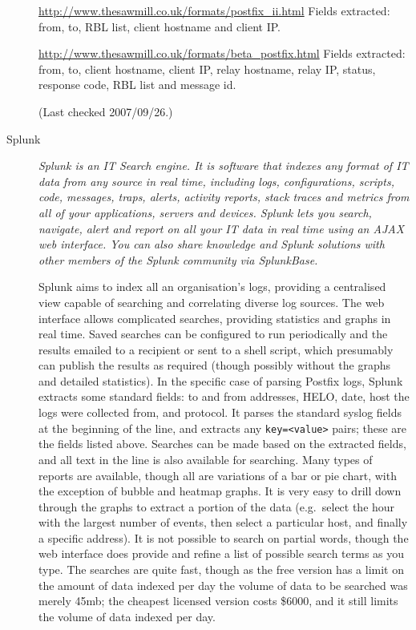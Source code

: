\documentclass[a4paper,12pt,draft]{article}
\begin{document}
\begin{description}
        \url{http://www.thesawmill.co.uk/formats/postfix_ii.html} \newline
        Fields extracted: from, to, RBL list, client hostname and client
        IP\@.

        \url{http://www.thesawmill.co.uk/formats/beta_postfix.html}
        \newline Fields extracted: from, to, client hostname, client IP,
        relay hostname, relay IP, status, response code, RBL list and
        message id.

        (Last checked 2007/09/26.)

    \item [Splunk] \textit{Splunk is an IT Search engine. It is software
        that indexes any format of IT data from any source in real time,
        including logs, configurations, scripts, code, messages, traps,
        alerts, activity reports, stack traces and metrics from all of your
        applications, servers and devices. Splunk lets you search,
        navigate, alert and report on all your IT data in real time using
        an AJAX web interface. You can also share knowledge and Splunk
        solutions with other members of the Splunk community via
        SplunkBase.\/}

        Splunk aims to index all an organisation's logs, providing a
        centralised view capable of searching and correlating diverse log
        sources.  The web interface allows complicated searches, providing
        statistics and graphs in real time.  Saved searches can be
        configured to run periodically and the results emailed to a
        recipient or sent to a shell script, which presumably can publish
        the results as required (though possibly without the graphs and
        detailed statistics).  In the specific case of parsing Postfix
        logs, Splunk extracts some standard fields: to and from addresses,
        HELO, date, host the logs were collected from, and protocol.  It
        parses the standard syslog fields at the beginning of the line, and
        extracts any \texttt{key=<value>} pairs; these are the fields
        listed above.  Searches can be made based on the extracted fields,
        and all text in the line is also available for searching.  Many
        types of reports are available, though all are variations of a bar
        or pie chart, with the exception of bubble and heatmap graphs.  It
        is very easy to drill down through the graphs to extract a portion
        of the data (e.g.\ select the hour with the largest number of
        events, then select a particular host, and finally a specific
        address).  It is not possible to search on partial words, though
        the web interface does provide and refine a list of possible search
        terms as you type.  The searches are quite fast, though as the free
        version has a limit on the amount of data indexed per day the
        volume of data to be searched was merely 45mb; the cheapest
        licensed version costs \$6000, and it still limits the volume of
        data indexed per day.


\end{description}
\end{document}
